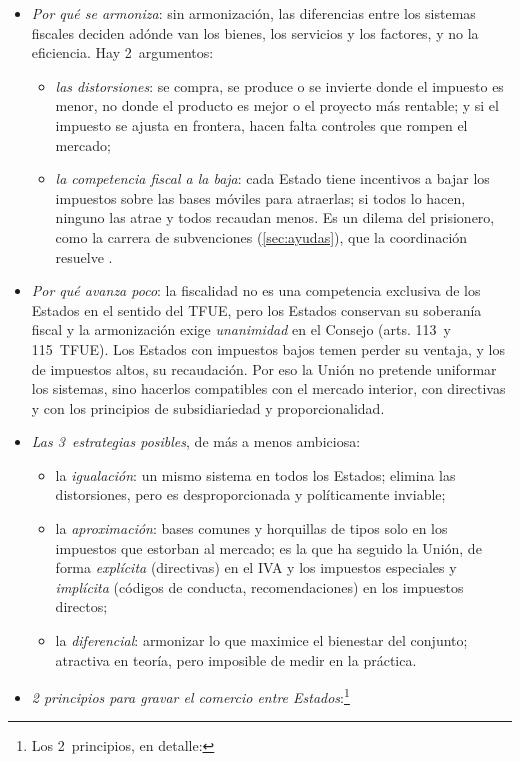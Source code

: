\documentclass[11pt]{article}
\begin{document}
\begin{itemize}
\item \emph{Por qué se armoniza}: sin armonización, las diferencias entre los sistemas fiscales deciden adónde van los bienes, los servicios y los factores, y no la eficiencia. Hay 2~argumentos:
  \begin{itemize}
  \item \emph{las distorsiones}: se compra, se produce o se invierte donde el impuesto es menor, no donde el producto es mejor o el proyecto más rentable; y si el impuesto se ajusta en frontera, hacen falta controles que rompen el mercado;
  \item \emph{la competencia fiscal a la baja}: cada Estado tiene incentivos a bajar los impuestos sobre las bases móviles para atraerlas; si todos lo hacen, ninguno las atrae y todos recaudan menos. Es un dilema del prisionero, como la carrera de subvenciones (\ref{sec:ayudas}), que la coordinación resuelve .
  \end{itemize}
\item \emph{Por qué avanza poco}: la fiscalidad no es una competencia exclusiva de los Estados en el sentido del TFUE, pero los Estados conservan su soberanía fiscal y la armonización exige \emph{unanimidad} en el Consejo (arts. 113~y 115~TFUE). Los Estados con impuestos bajos temen perder su ventaja, y los de impuestos altos, su recaudación. Por eso la Unión no pretende uniformar los sistemas, sino hacerlos compatibles con el mercado interior, con directivas y con los principios de subsidiariedad y proporcionalidad.
\item \emph{Las 3~estrategias posibles}, de más a menos ambiciosa:
  \begin{itemize}
  \item la \emph{igualación}: un mismo sistema en todos los Estados; elimina las distorsiones, pero es desproporcionada y políticamente inviable;
  \item la \emph{aproximación}: bases comunes y horquillas de tipos solo en los impuestos que estorban al mercado; es la que ha seguido la Unión, de forma \emph{explícita} (directivas) en el IVA y los impuestos especiales y \emph{implícita} (códigos de conducta, recomendaciones) en los impuestos directos;
  \item la \emph{diferencial}: armonizar lo que maximice el bienestar del conjunto; atractiva en teoría, pero imposible de medir en la práctica.
  \end{itemize}
\item \emph{2 principios para gravar el comercio entre Estados}:\footnote{Los 2~principios, en detalle:
}
\end{itemize}
\end{document}
